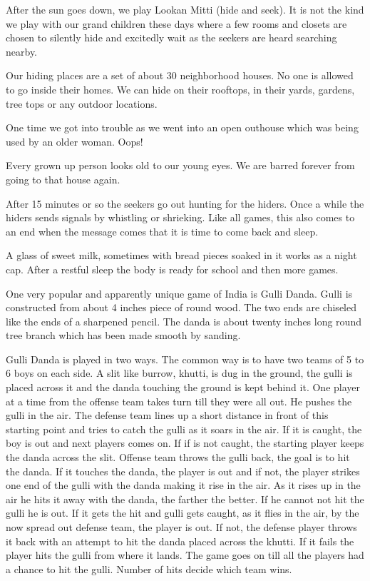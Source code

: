 After the sun goes down, we play Lookan Mitti (hide and seek). It is not
the kind we play with our grand children these days where a few rooms and
closets are chosen to silently hide and excitedly wait as the seekers are
heard searching nearby. 

Our hiding places are a set of about 30 neighborhood houses. No one is
allowed to go inside their homes. We can hide on their rooftops, in their
yards, gardens, tree tops or any outdoor locations. 

One time we got into trouble as we went into an open outhouse which was
being used by an older woman. Oops! 

Every grown up person looks old to our young eyes. We are barred forever
from going to that house again. 

After 15 minutes or so the seekers go out hunting for the hiders. Once
a while the hiders sends signals by whistling or shrieking. Like all
games, this also comes to an end when the message comes that it is time to
come back and sleep. 

A glass of sweet milk, sometimes with bread pieces soaked in it works as
a night cap. After a restful sleep the body is ready for school and then
more games. 

One very popular and apparently unique game of India is Gulli Danda. Gulli
is constructed from about 4 inches piece of round wood. The two ends are
chiseled like the ends of a sharpened pencil. The danda is about twenty
inches long round tree branch which has been made smooth by sanding. 

Gulli Danda is played in two ways. The common way is to have two teams of
5 to 6 boys on each side. A slit like burrow, khutti, is dug in the
ground, the gulli is placed across it and the danda touching the ground is
kept  behind it. One player at a time from the offense team takes turn
till they were all out. He pushes the gulli in the air. The defense team
lines up a short distance in front of this starting point and tries to
catch the gulli as it soars in the air. If it is caught, the boy is out
and next players comes on. If if is not caught, the starting player keeps
the danda across the slit. Offense team throws the gulli back, the goal is
to hit the danda.  If it touches the danda, the player is out and if not,
the player strikes one end of the gulli with the danda making it rise in
the air. As it rises up in the air he hits it away with the danda, the
farther the better. If he cannot not hit the gulli he is out. If it gets
the hit and gulli gets caught, as it flies in the air, by the now spread
out defense team, the player is out. If not, the defense player throws it
back with an attempt to hit the danda placed across the khutti. If it
fails the player hits the gulli from where it lands. The game goes on till
all the players had a chance to hit the gulli. Number of hits decide which
team wins. 

